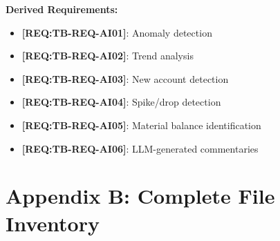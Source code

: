 \documentclass[11pt,a4paper]{article}
\newcommand{\reqref}[1]{\textcolor{reqpurple}{\textbf{[REQ:#1]}}}
\begin{document}
\textbf{Derived Requirements:}
\begin{itemize}[noitemsep]
    \item \reqref{TB-REQ-AI01}: Anomaly detection
    \item \reqref{TB-REQ-AI02}: Trend analysis
    \item \reqref{TB-REQ-AI03}: New account detection
    \item \reqref{TB-REQ-AI04}: Spike/drop detection
    \item \reqref{TB-REQ-AI05}: Material balance identification
    \item \reqref{TB-REQ-AI06}: LLM-generated commentaries
\end{itemize}


\newpage
\section*{Appendix B: Complete File Inventory}
\end{document}
